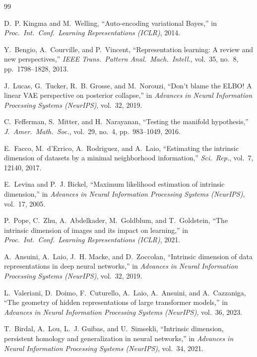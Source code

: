 \documentclass[11pt,a4paper]{jsarticle}
\begin{document}
\begin{thebibliography}{99}

D.~P. Kingma and M.~Welling,
``Auto-encoding variational Bayes,''
in \textit{Proc.\ Int.\ Conf.\ Learning Representations (ICLR)}, 2014.

Y.~Bengio, A.~Courville, and P.~Vincent,
``Representation learning: A review and new perspectives,''
\textit{IEEE Trans.\ Pattern Anal.\ Mach.\ Intell.}, vol.~35, no.~8,
pp.~1798--1828, 2013.

J.~Lucas, G.~Tucker, R.~B. Grosse, and M.~Norouzi,
``Don't blame the ELBO! A linear VAE perspective on posterior collapse,''
in \textit{Advances in Neural Information Processing Systems (NeurIPS)},
vol.~32, 2019.

C.~Fefferman, S.~Mitter, and H.~Narayanan,
``Testing the manifold hypothesis,''
\textit{J.\ Amer.\ Math.\ Soc.}, vol.~29, no.~4, pp.~983--1049, 2016.

E.~Facco, M.~d'Errico, A.~Rodriguez, and A.~Laio,
``Estimating the intrinsic dimension of datasets by a minimal neighborhood
information,''
\textit{Sci.\ Rep.}, vol.~7, 12140, 2017.

E.~Levina and P.~J. Bickel,
``Maximum likelihood estimation of intrinsic dimension,''
in \textit{Advances in Neural Information Processing Systems (NeurIPS)},
vol.~17, 2005.

P.~Pope, C.~Zhu, A.~Abdelkader, M.~Goldblum, and T.~Goldstein,
``The intrinsic dimension of images and its impact on learning,''
in \textit{Proc.\ Int.\ Conf.\ Learning Representations (ICLR)}, 2021.

A.~Ansuini, A.~Laio, J.~H. Macke, and D.~Zoccolan,
``Intrinsic dimension of data representations in deep neural networks,''
in \textit{Advances in Neural Information Processing Systems (NeurIPS)},
vol.~32, 2019.

L.~Valeriani, D.~Doimo, F.~Cuturello, A.~Laio, A.~Ansuini, and A.~Cazzaniga,
``The geometry of hidden representations of large transformer models,''
in \textit{Advances in Neural Information Processing Systems (NeurIPS)},
vol.~36, 2023.

T.~Birdal, A.~Lou, L.~J. Guibas, and U.~Simsekli,
``Intrinsic dimension, persistent homology and generalization in neural
networks,''
in \textit{Advances in Neural Information Processing Systems (NeurIPS)},
vol.~34, 2021.


\end{thebibliography}
\end{document}
